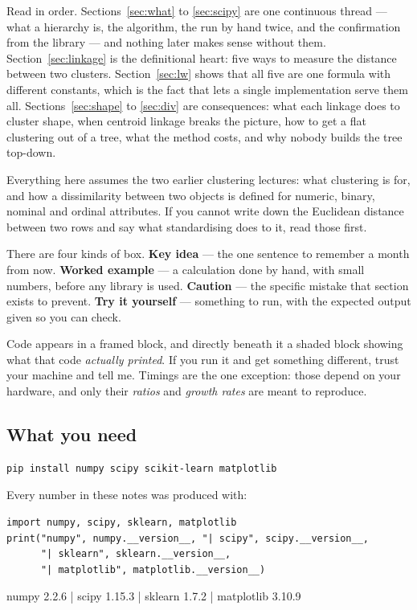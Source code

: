 \documentclass[11pt]{article}
\begin{document}
Read in order. Sections~\ref{sec:what} to \ref{sec:scipy} are one continuous
thread --- what a hierarchy is, the algorithm, the run by hand twice, and the
confirmation from the library --- and nothing later makes sense without them.
Section~\ref{sec:linkage} is the definitional heart: five ways to measure the
distance between two clusters. Section~\ref{sec:lw} shows that all five are
one formula with different constants, which is the fact that lets a single
implementation serve them all. Sections~\ref{sec:shape} to \ref{sec:div} are
consequences: what each linkage does to cluster shape, when centroid linkage
breaks the picture, how to get a flat clustering out of a tree, what the
method costs, and why nobody builds the tree top-down.

Everything here assumes the two earlier clustering lectures: what clustering
is for, and how a dissimilarity between two objects is defined for numeric,
binary, nominal and ordinal attributes. If you cannot write down the
Euclidean distance between two rows and say what standardising does to it,
read those first.

There are four kinds of box. \textbf{Key idea} --- the one sentence to
remember a month from now. \textbf{Worked example} --- a calculation done by
hand, with small numbers, before any library is used. \textbf{Caution} --- the
specific mistake that section exists to prevent. \textbf{Try it yourself} ---
something to run, with the expected output given so you can check.

Code appears in a framed block, and directly beneath it a shaded block showing
what that code \emph{actually printed}. If you run it and get something
different, trust your machine and tell me. Timings are the one exception:
those depend on your hardware, and only their \emph{ratios} and \emph{growth
rates} are meant to reproduce.

\subsection{What you need}

\begin{lstlisting}
pip install numpy scipy scikit-learn matplotlib
\end{lstlisting}

Every number in these notes was produced with:

\begin{lstlisting}
import numpy, scipy, sklearn, matplotlib
print("numpy", numpy.__version__, "| scipy", scipy.__version__,
      "| sklearn", sklearn.__version__,
      "| matplotlib", matplotlib.__version__)
\end{lstlisting}
\begin{codeout}
numpy 2.2.6 | scipy 1.15.3 | sklearn 1.7.2 | matplotlib 3.10.9
\end{codeout}
\end{document}
